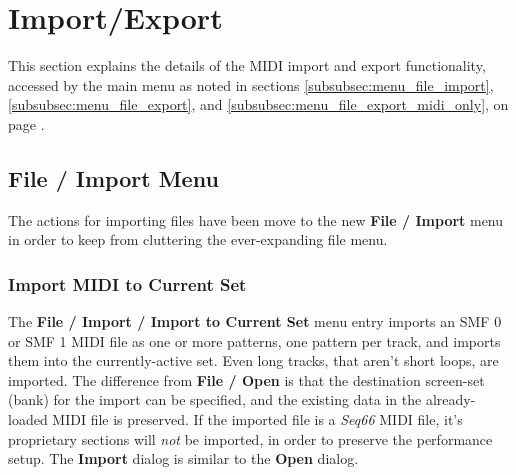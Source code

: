 %
%
%

\section{Import/Export}
\label{sec:midi_export}

   This section explains the details of the MIDI import and export
   functionality, accessed by the main menu as noted in sections
   \ref{subsubsec:menu_file_import},
   \ref{subsubsec:menu_file_export}, and
   \ref{subsubsec:menu_file_export_midi_only}, on page
   \pageref{subsubsec:menu_file_import}.

\subsection{File / Import Menu}
\label{subsec:midi_export_file_import_menu}

   The actions for importing files have been move to the new
   \textbf{File / Import} menu in order to keep from cluttering the
   ever-expanding file menu.

\subsubsection{Import MIDI to Current Set}
\label{subsubsec:midi_export_file_import}

   The \textbf{File / Import / Import to Current Set} menu entry imports an SMF 0
   or SMF 1 MIDI file as one or more patterns, one pattern per track, and
   imports them into the currently-active set.
   Even long tracks, that aren't short loops, are imported.
   The difference from \textbf{File / Open} is that the destination screen-set
   (bank) for the import can be specified, and the existing data in the
   already-loaded MIDI file is preserved.
   If the imported file is a
   \textsl{Seq66} MIDI file, it's proprietary sections will
   \textsl{not} be imported, in order to preserve the performance setup.
   The \textbf{Import} dialog is similar to the \textbf{Open} dialog.

